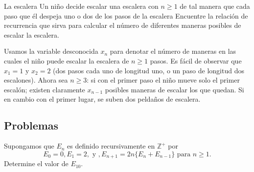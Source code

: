 \begin{example}{La escalera}
	Un niño decide escalar una escalera con $n\geq 1$ de tal manera que cada paso que él despeja uno o dos de los pasos de la escalera %
	Encuentre la relación de recurrencia que sirva para calcular el número de diferentes maneras posibles de escalar la escalera.
\end{example}
Usamos la variable desconocida $x_{n}$ para denotar el número de maneras en las cuales el niño puede escalar la escalera de $n\geq1$ pasos. Es fácil de observar que $x_{1}=1$ y $x_{2}=2$ (dos pasos cada uno de longitud uno, o un paso de longitud dos escalones). Ahora sea $n\geq3$: si con el primer paso el niño mueve solo el primer escalón; existen claramente $x_{n-1}$ posibles maneras de escalar los que quedan. Si en cambio con el primer lugar, se suben dos peldaños de escalera.
%
%
%
%
%
%
%
%
%

\subsection{Problemas}

\begin{exercise}
Supongamos que $E_n$ es definido recursivamente en $\mathds{Z}^+$ por \[ E_0=0,E_1=2,\text{ y },E_{n+1}=2n\{E_n+E_{n-1}\} \text{ para }n\geq 1. \] Determine el valor de $E_{10}$.
\end{exercise}


